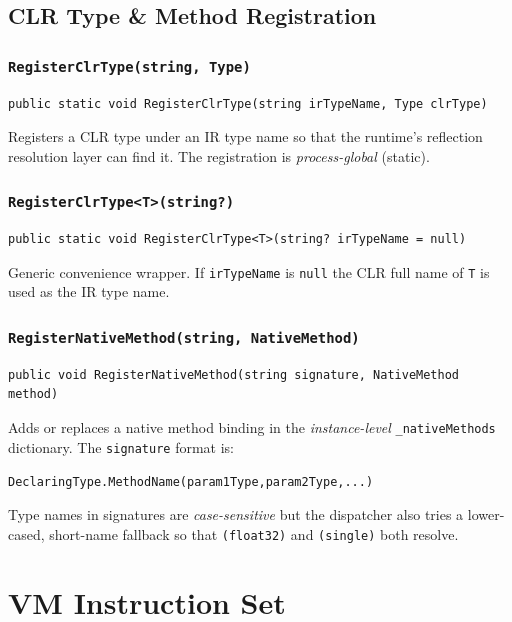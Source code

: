 \documentclass[11pt,a4paper]{article}
\newcommand{\code}[1]{\texttt{\small #1}}
\begin{document}
\subsection{CLR Type \& Method Registration}

\subsubsection{\texttt{RegisterClrType(string, Type)}}
\begin{lstlisting}[style=cs]
public static void RegisterClrType(string irTypeName, Type clrType)
\end{lstlisting}
Registers a CLR type under an IR type name so that the runtime's reflection
resolution layer can find it. The registration is \emph{process-global} (static).

\subsubsection{\texttt{RegisterClrType<T>(string?)}}
\begin{lstlisting}[style=cs]
public static void RegisterClrType<T>(string? irTypeName = null)
\end{lstlisting}
Generic convenience wrapper. If \code{irTypeName} is \code{null} the CLR full name
of \code{T} is used as the IR type name.

\subsubsection{\texttt{RegisterNativeMethod(string, NativeMethod)}}
\begin{lstlisting}[style=cs]
public void RegisterNativeMethod(string signature, NativeMethod method)
\end{lstlisting}
Adds or replaces a native method binding in the \emph{instance-level}
\code{\_nativeMethods} dictionary. The \code{signature} format is:

\begin{center}
  \code{DeclaringType.MethodName(param1Type,param2Type,...)}
\end{center}

Type names in signatures are \emph{case-sensitive} but the dispatcher also tries a
lower-cased, short-name fallback so that \code{(float32)} and \code{(single)} both
resolve.

\section{VM Instruction Set}
\end{document}
